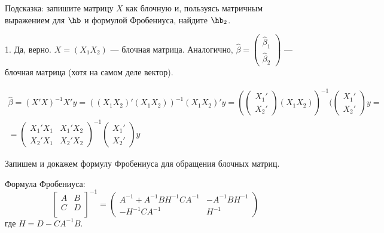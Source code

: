 \documentclass[pdftex,11pt,openany]{book}\usepackage[]{graphicx}\usepackage[]{color}
\begin{document}
\begin{solution}
Подсказка: запишите матрицу $X$ как блочную и, пользуясь матричным выражением для $\hb$ и формулой Фробениуса, найдите $\hb_2$.

1. Да, верно.
$X=(X_1 X_2)$ --- блочная матрица. Аналогично, $\hat\beta=\left(\begin{array}{c}
\hat\beta_1\\ 
\hat\beta_2
\end{array}\right)$ --- блочная матрица (хотя на самом деле вектор).

\begin{multline*}
\hat\beta=(X'X)^{-1}X'y=((X_1X_2)'(X_1X_2))^{-1}(X_1X_2)'y=(\left(\begin{array}{c}
X_1'\\ 
X_2'
\end{array}\right)(X_1X_2))^{-1}(\left(\begin{array}{c}
X_1'\\ 
X_2'
\end{array}\right)y=\\=
\left(\begin{array}{cc}
X_1'X_1 & X_1'X_2\\ 
X_2'X_1 & X_2'X_2
\end{array}\right)^{-1}\left(\begin{array}{c}
X_1'\\ 
X_2'
\end{array}\right)y
\end{multline*}

Запишем и докажем формулу Фробениуса для обращения блочных матриц.

Формула Фробениуса:
\[
\begin{bmatrix} A & B \\ 
C & D \\ 
\end{bmatrix}^{-1}=
\begin{pmatrix} 
A^{-1} +A^{-1} BH^{-1} CA^{-1}  & -A^{-1} BH^{-1}\\
 -H^{-1} CA^{-1}  & H^{-1}
\end{pmatrix} 
\]
где $H=D-CA^{-1}B$.


\end{solution}
\end{document}
